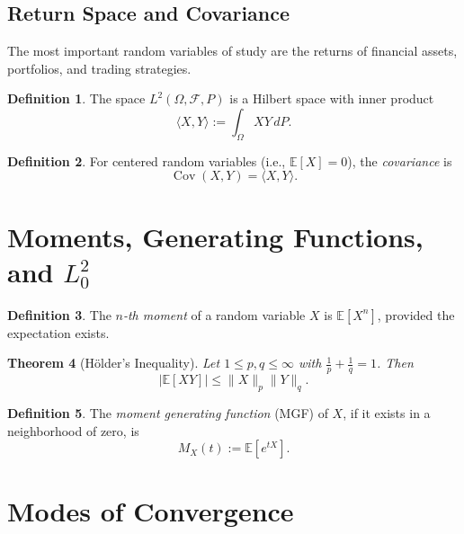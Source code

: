 \documentclass[11pt,reqno]{amsart}
\newtheorem{theorem}{Theorem}[section]
\theoremstyle{definition}
\newtheorem{definition}[theorem]{Definition}
\theoremstyle{remark}
\begin{document}
\subsection{Return Space and Covariance}

The most important random variables of study are the returns of financial assets, portfolios, and trading strategies.

\begin{definition}
	The space $L^2(\Omega, \mathcal{F}, P)$ is a Hilbert space with inner product
	\[
		\langle X, Y \rangle := \int_\Omega X Y \, dP.
	\]
\end{definition}

\begin{definition}
	For centered random variables (i.e., $\mathbb{E}[X]=0$), the \emph{covariance} is
	\[
		\operatorname{Cov}(X, Y) = \langle X, Y \rangle.
	\]
\end{definition}

\section{Moments, Generating Functions, and \(L^2_0\)}

\begin{definition}
	The \emph{$n$-th moment} of a random variable $X$ is $\mathbb{E}[X^n]$, provided the expectation exists.
\end{definition}

\begin{theorem}[Hölder's Inequality]
	Let $1 \leq p, q \leq \infty$ with $\frac{1}{p} + \frac{1}{q} = 1$. Then
	\[
		|\mathbb{E}[XY]| \leq \|X\|_p \|Y\|_q.
	\]
\end{theorem}

\begin{definition}
	The \emph{moment generating function} (MGF) of $X$, if it exists in a neighborhood of zero, is
	\[
		M_X(t) := \mathbb{E}[e^{tX}].
	\]
\end{definition}

\section{Modes of Convergence}
\end{document}
